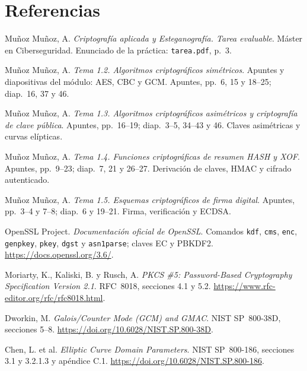 \chapter{Referencias}
\label{sec:referencias}

\begingroup
{}
\begin{enumerate}[label={[\arabic*]},leftmargin=*,itemsep=6pt,parsep=0pt]
  \item Muñoz Muñoz, A. \textit{Criptografía aplicada y Esteganografía. Tarea evaluable}. Máster en Ciberseguridad. Enunciado de la práctica: \texttt{tarea.pdf}, p.~3.
  \item\label{ref:tema-aes}\label{ref:slides-gcm}\label{ref:tema-gcm} Muñoz Muñoz, A. \textit{Tema 1.2. Algoritmos criptográficos simétricos}. Apuntes y diapositivas del módulo: AES, CBC y GCM. Apuntes, pp.~6, 15 y 18--25; diap.~16, 37 y 46.
  \item\label{ref:p3-asimetrica}\label{ref:p3-curvas} Muñoz Muñoz, A. \textit{Tema 1.3. Algoritmos criptográficos asimétricos y criptografía de clave pública}. Apuntes, pp.~16--19; diap.~3--5, 34--43 y 46. Claves asimétricas y curvas elípticas.
  \item\label{ref:tema-kdf}\label{ref:slides-kdf}\label{ref:tema-aead} Muñoz Muñoz, A. \textit{Tema 1.4. Funciones criptográficas de resumen HASH y XOF}. Apuntes, pp.~9--23; diap.~7, 21 y 26--27. Derivación de claves, HMAC y cifrado autenticado.
  \item\label{ref:p3-firma}\label{ref:p3-ecdsa} Muñoz Muñoz, A. \textit{Tema 1.5. Esquemas criptográficos de firma digital}. Apuntes, pp.~3--4 y 7--8; diap.~6 y 19--21. Firma, verificación y ECDSA.
  \item\label{ref:openssl-pbkdf2}\label{ref:openssl-kdf-cli}\label{ref:openssl-gcm}\label{ref:p3-openssl} OpenSSL Project. \textit{Documentación oficial de OpenSSL}. Comandos \texttt{kdf}, \texttt{cms}, \texttt{enc}, \texttt{genpkey}, \texttt{pkey}, \texttt{dgst} y \texttt{asn1parse}; claves EC y PBKDF2. \url{https://docs.openssl.org/3.6/}.
  \item\label{ref:rfc-pbkdf2} Moriarty, K., Kaliski, B. y Rusch, A. \textit{PKCS \#5: Password-Based Cryptography Specification Version 2.1}. RFC~8018, secciones 4.1 y 5.2. \url{https://www.rfc-editor.org/rfc/rfc8018.html}.
  \item\label{ref:nist-gcm} Dworkin, M. \textit{Galois/Counter Mode (GCM) and GMAC}. NIST SP~800-38D, secciones 5--8. \url{https://doi.org/10.6028/NIST.SP.800-38D}.
  \item\label{ref:p3-parametros} Chen, L. et al. \textit{Elliptic Curve Domain Parameters}. NIST SP~800-186, secciones 3.1 y 3.2.1.3 y apéndice C.1. \url{https://doi.org/10.6028/NIST.SP.800-186}.
\end{enumerate}
\endgroup
